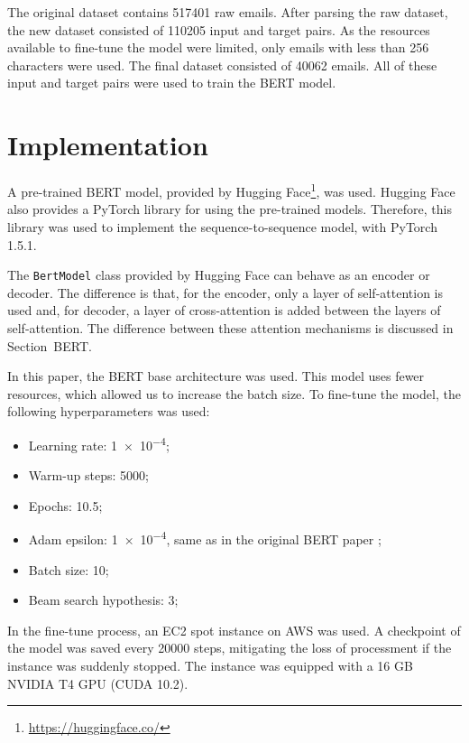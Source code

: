 \documentclass[letterpaper]{article}
\begin{document}
The original dataset contains \num{517401} raw emails. After parsing the raw dataset, the new dataset consisted of \num{110205} input and target pairs. As the resources available to fine-tune the model were limited,  only emails with less than \num{256} characters were used. The final dataset consisted of \num{40062} emails. All of these input and target pairs were used to train the BERT model.


\section{Implementation}

A pre-trained BERT model, provided by Hugging Face\footnote{\href{https://huggingface.co/}{https://huggingface.co/}}, was used. Hugging Face also provides a PyTorch library for using the pre-trained models. Therefore, this library was used to implement the sequence-to-sequence model, with PyTorch 1.5.1.

The \texttt{BertModel} class provided by Hugging Face can behave as an encoder or decoder. The difference is that, for the encoder, only a layer of self-attention is used and, for decoder, a layer of cross-attention is added between the layers of self-attention. The difference between these attention mechanisms is discussed in Section~BERT.

In this paper, the BERT base architecture was used. This model uses fewer resources, which allowed us to increase the batch size. To fine-tune the model, the following hyperparameters was used:

\begin{itemize}
    \item Learning rate: \num{1e-4};
    \item Warm-up steps: \num{5000};
    \item Epochs: \num{10.5};
    \item Adam epsilon: \num{1e-4}, same as in the original BERT paper \cite{DBLP:journals/corr/abs-1810-04805};
    \item Batch size: \num{10};
    \item Beam search hypothesis: \num{3};
\end{itemize}

In the fine-tune process, an EC2 spot instance on AWS was used. A checkpoint of the model was saved every \num{20000} steps, mitigating the loss of processment if the instance was suddenly stopped. The instance was equipped with a 16 GB NVIDIA T4 GPU (CUDA 10.2).
\end{document}
